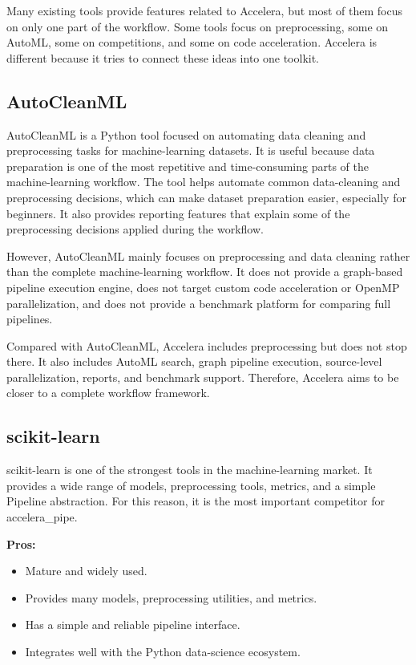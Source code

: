 \documentclass[12pt,a4paper]{report}
\begin{document}
Many existing tools provide features related to Accelera, but most of them focus
on only one part of the workflow. Some tools focus on preprocessing, some on
AutoML, some on competitions, and some on code acceleration. Accelera is
different because it tries to connect these ideas into one toolkit.


\subsection{AutoCleanML}

AutoCleanML is a Python tool focused on automating data cleaning and
preprocessing tasks for machine-learning datasets. It is useful because data
preparation is one of the most repetitive and time-consuming parts of the
machine-learning workflow. The tool helps automate common data-cleaning and
preprocessing decisions, which can make dataset preparation easier, especially
for beginners. It also provides reporting features that explain some of the
preprocessing decisions applied during the workflow.

\medskip
\noindent However, AutoCleanML mainly focuses on preprocessing and data cleaning rather
than the complete machine-learning workflow. It does not provide a graph-based
pipeline execution engine, does not target custom code acceleration or OpenMP
parallelization, and does not provide a benchmark platform for comparing full
pipelines.

\medskip
\noindent Compared with AutoCleanML, Accelera includes preprocessing but does not stop
there. It also includes AutoML search, graph pipeline execution, source-level
parallelization, reports, and benchmark support. Therefore, Accelera aims to be
closer to a complete workflow framework.


\subsection{scikit-learn}

scikit-learn is one of the strongest tools in the machine-learning
market. It provides a wide range of models, preprocessing tools, metrics, and a
simple Pipeline abstraction. For this reason, it is the most important
competitor for accelera\_pipe.

\textbf{Pros:}
\begin{itemize}
  \item Mature and widely used.
  \item Provides many models, preprocessing utilities, and metrics.
  \item Has a simple and reliable pipeline interface.
  \item Integrates well with the Python data-science ecosystem.
\end{itemize}
\end{document}
